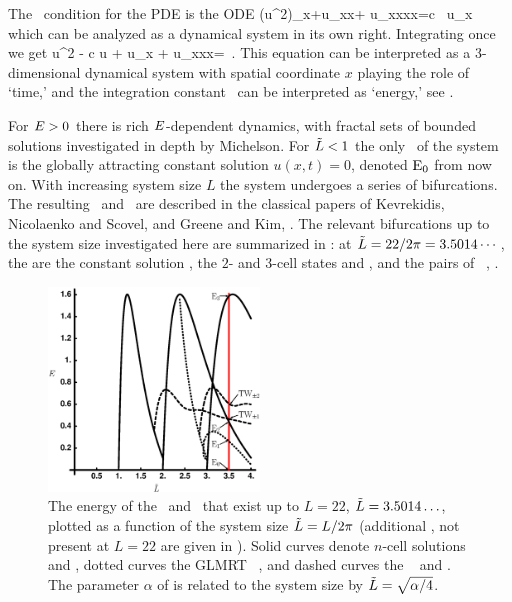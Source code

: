The \reqv\ condition for the {\KS} PDE 
is the ODE
\beq
{\textstyle{}}(u^2)_x+u_{xx}+ u_{xxxx}=c \, u_x
which can be analyzed as a dynamical system in its own right.
Integrating once we get
\beq
{\textstyle{}}u^2 - c u + u_x + u_{xxx}=\expctE
\,.
\label{eq:stdks}
\eeq
This equation can be interpreted as a 3-dimen\-si\-on\-al dynamical system
with spatial coordinate $x$ playing the role of `time,'
and the integration constant \expctE\ can be interpreted as `energy,'
see .

For $E>0$ there is rich $E$-dependent dynamics,
with fractal sets of bounded solutions investigated in depth
by Michelson. For $\tilde{L}<1$ the only \eqv\ of the
system is the globally attracting constant solution
$u(x,t)=0$, denoted $\mathrm{E}_{0}$ from now on. With increasing
system size $L$ the system undergoes a series of
bifurcations. The resulting \eqva\ and \reqva\ are described
in the classical papers of Kevrekidis, Nicolaenko and
Scovel, and Greene and Kim,
. The relevant bifurcations up to the
system size investigated here are summarized in
: at $\tilde{L}=22/2\pi = 3.5014\cdots$,
the {\eqva} are the constant solution ,
the $2$- and $3$-cell states
 and , and the pairs of \reqva\ ,
.

\begin{figure}[t]       \label{fig:ksBifDiag}
\begin{center}
\includegraphics[width=0.5\textwidth]{figs/ksBifDiag_pst.eps}
\end{center}
\caption{
The energy  of the \eqva\ and \reqva\ that
exist up to $L=22$, $\tilde{L} = 3.5014\ldots$, plotted as a function
of the system size $\tilde{L} = L/2\pi$ (additional \eqva, not present
at $L = 22$ are given in ). Solid curves denote
$n$-cell solutions  and , dotted curves the GLMRT
\eqv\ ,
and dashed curves the \reqva\  and .
The parameter $\alpha$ of  is
related to the system size by $\tilde{L}=\sqrt{\alpha/4}$.
        }
\end{figure}

